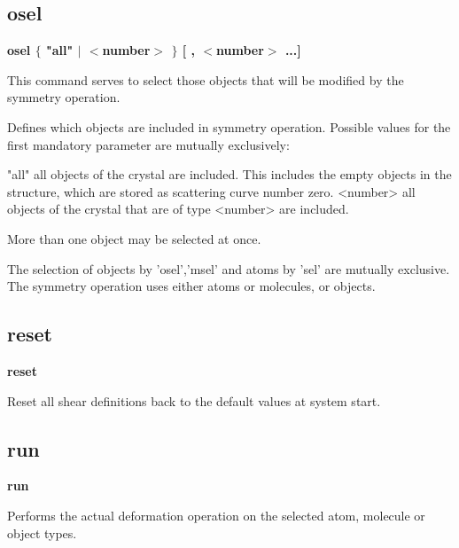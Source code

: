 \subsection*{osel}
{\bf osel $ \{$ "all" $| $ $ <$number$> $ $\} $ [ , $ <$number$> $ ...] \par }
\par
\vspace{3pt}
This command serves to select 
those objects that will be modified by the symmetry operation. 
\par
Defines which objects are included in symmetry operation. Possible values 
for the first mandatory parameter are mutually exclusively: 
\par
\begin{MacVerbatim}
"all"     all objects of the crystal are included.
          This includes the empty objects in the structure, which are
          stored as scattering curve number zero.
<number>  all objects of the crystal that are of type <number>
          are included.
\end{MacVerbatim}
More than one object may be selected at once. 
\par
The selection of objects by 'osel','msel' and atoms by 'sel' are mutually 
exclusive. The symmetry operation uses either atoms or molecules, 
or objects. 
\subsection*{reset}
{\bf reset \par }
\par
\vspace{3pt}
Reset all shear definitions back to the default values at 
system start. 
\subsection*{run}
{\bf run \par }
\par
\vspace{3pt}
Performs the actual deformation operation on the selected 
atom, molecule or object types. 

